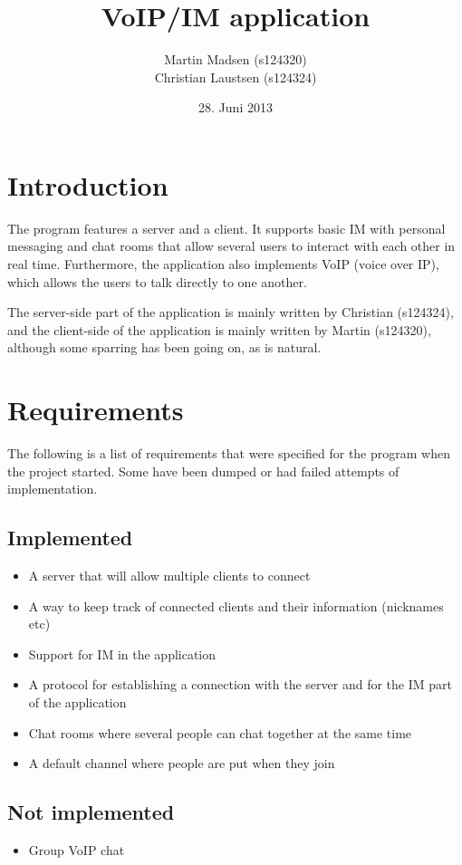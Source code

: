 \documentclass[12pt]{rapport}
\title{VoIP/IM application}
\author{
  Martin Madsen (s124320)\\
  Christian Laustsen (s124324)
}
\date{28. Juni 2013}
\begin{document}
\maketitle

\section*{Introduction}
The program features a server and a client. It supports basic IM with
personal messaging and chat rooms that allow several users to interact
with each other in real time. Furthermore, the application also
implements VoIP (voice over IP), which allows the users to talk
directly to one another.\newline


The server-side part of the application is mainly written by Christian
(s124324), and the client-side of the application is mainly written by
Martin (s124320), although some sparring has been going on, as is
natural.


\section*{Requirements}
The following is a list of requirements that were specified for the
program when the project started. Some have been dumped or had failed
attempts of implementation.

\subsection*{Implemented}
\begin{itemize}
  \item A server that will allow multiple clients to connect
  \item A way to keep track of connected clients and their information
    (nicknames etc)
  \item Support for IM in the application
  \item A protocol for establishing a connection with the server and
    for the IM part of the application
  \item Chat rooms where several people can chat together at the same
    time
  \item A default channel where people are put when they join
\end{itemize}

\subsection*{Not implemented}
\begin{itemize}
  \item Group VoIP chat
\end{itemize}
\end{document}
